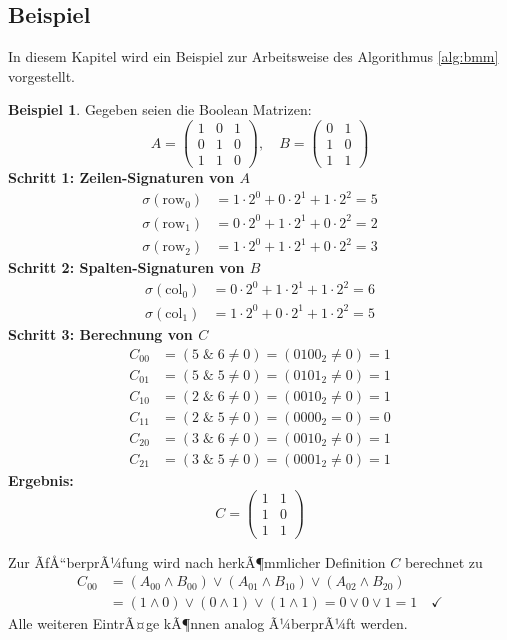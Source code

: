 ﻿\documentclass[a4paper,12pt]{article}
\theoremstyle{definition}
\newtheorem{beispiel}{Beispiel}
\begin{document}
\subsection{Beispiel}
In diesem Kapitel wird ein Beispiel zur Arbeitsweise des Algorithmus \ref{alg:bmm} vorgestellt.

\begin{beispiel}
	Gegeben seien die Boolean Matrizen:
	\[
	A = \begin{pmatrix}
		1 & 0 & 1 \\
		0 & 1 & 0 \\
		1 & 1 & 0
	\end{pmatrix}, \quad
	B = \begin{pmatrix}
		0 & 1 \\
		1 & 0 \\
		1 & 1
	\end{pmatrix}
	\]
	\textbf{Schritt 1: Zeilen-Signaturen von $A$}
	\begin{align*}
		\sigma(\text{row}_0) &= 1 \cdot 2^0 + 0 \cdot 2^1 + 1 \cdot 2^2 = 5 \\
		\sigma(\text{row}_1) &= 0 \cdot 2^0 + 1 \cdot 2^1 + 0 \cdot 2^2 = 2 \\
		\sigma(\text{row}_2) &= 1 \cdot 2^0 + 1 \cdot 2^1 + 0 \cdot 2^2 = 3
	\end{align*}
	\textbf{Schritt 2: Spalten-Signaturen von $B$}
	\begin{align*}
		\sigma(\text{col}_0) &= 0 \cdot 2^0 + 1 \cdot 2^1 + 1 \cdot 2^2 = 6 \\
		\sigma(\text{col}_1) &= 1 \cdot 2^0 + 0 \cdot 2^1 + 1 \cdot 2^2 = 5
	\end{align*}
	\textbf{Schritt 3: Berechnung von $C$}
	\begin{align*}
		C_{00} &= (5 \; \& \; 6 \neq 0) = (0100_2 \neq 0) = 1 \\
		C_{01} &= (5 \; \& \; 5 \neq 0) = (0101_2 \neq 0) = 1 \\
		C_{10} &= (2 \; \& \; 6 \neq 0) = (0010_2 \neq 0) = 1 \\
		C_{11} &= (2 \; \& \; 5 \neq 0) = (0000_2 = 0) = 0 \\
		C_{20} &= (3 \; \& \; 6 \neq 0) = (0010_2 \neq 0) = 1 \\
		C_{21} &= (3 \; \& \; 5 \neq 0) = (0001_2 \neq 0) = 1
	\end{align*}
	\textbf{Ergebnis:}
	\[
	C = \begin{pmatrix}
		1 & 1 \\
		1 & 0 \\
		1 & 1
	\end{pmatrix}
	\]
\end{beispiel}
Zur ÃƒÅ“berprÃ¼fung wird nach herkÃ¶mmlicher Definition $C$ berechnet zu
\begin{align*}
	C_{00} &= (A_{00} \wedge B_{00}) \vee (A_{01} \wedge B_{10}) \vee (A_{02} \wedge B_{20}) \\
	&= (1 \wedge 0) \vee (0 \wedge 1) \vee (1 \wedge 1) = 0 \vee 0 \vee 1 = 1 \quad \checkmark
\end{align*}
Alle weiteren EintrÃ¤ge kÃ¶nnen analog Ã¼berprÃ¼ft werden.
\end{document}
